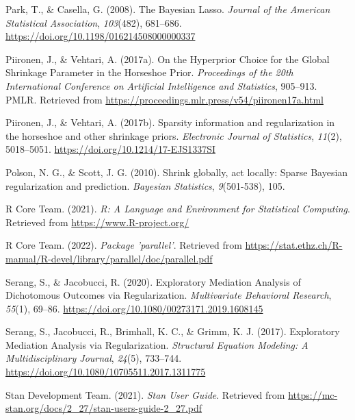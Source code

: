 \documentclass[
  man, donotrepeattitle,floatsintext]{apa6}
\newlength{\cslhangindent}
\newenvironment{CSLReferences}[2] %
 {\begin{list}{}{%
  \setlength{\itemindent}{0pt}
  \setlength{\leftmargin}{0pt}
  \setlength{\parsep}{0pt}
  \ifodd #1
   \setlength{\leftmargin}{\cslhangindent}
   \setlength{\itemindent}{-1\cslhangindent}
  \fi
  \setlength{\itemsep}{#2\baselineskip}}}
 {\end{list}}
\begin{document}
\begin{CSLReferences}{1}{0}
Park, T., \& Casella, G. (2008). The {Bayesian} {Lasso}. \emph{Journal of the American Statistical Association}, \emph{103}(482), 681--686. \url{https://doi.org/10.1198/016214508000000337}

Piironen, J., \& Vehtari, A. (2017a). On the {Hyperprior} {Choice} for the {Global} {Shrinkage} {Parameter} in the {Horseshoe} {Prior}. \emph{Proceedings of the 20th {International} {Conference} on {Artificial} {Intelligence} and {Statistics}}, 905--913. PMLR. Retrieved from \url{https://proceedings.mlr.press/v54/piironen17a.html}

Piironen, J., \& Vehtari, A. (2017b). Sparsity information and regularization in the horseshoe and other shrinkage priors. \emph{Electronic Journal of Statistics}, \emph{11}(2), 5018--5051. \url{https://doi.org/10.1214/17-EJS1337SI}

Polson, N. G., \& Scott, J. G. (2010). Shrink globally, act locally: {Sparse} {Bayesian} regularization and prediction. \emph{Bayesian Statistics}, \emph{9}(501-538), 105.

R Core Team. (2021). \emph{R: {A} {Language} and {Environment} for {Statistical} {Computing}}. Retrieved from \url{https://www.R-project.org/}

R Core Team. (2022). \emph{Package 'parallel'}. Retrieved from \url{https://stat.ethz.ch/R-manual/R-devel/library/parallel/doc/parallel.pdf}

Serang, S., \& Jacobucci, R. (2020). Exploratory {Mediation} {Analysis} of {Dichotomous} {Outcomes} via {Regularization}. \emph{Multivariate Behavioral Research}, \emph{55}(1), 69--86. \url{https://doi.org/10.1080/00273171.2019.1608145}

Serang, S., Jacobucci, R., Brimhall, K. C., \& Grimm, K. J. (2017). Exploratory {Mediation} {Analysis} via {Regularization}. \emph{Structural Equation Modeling: A Multidisciplinary Journal}, \emph{24}(5), 733--744. \url{https://doi.org/10.1080/10705511.2017.1311775}

Stan Development Team. (2021). \emph{Stan {User} {Guide}}. Retrieved from \url{https://mc-stan.org/docs/2_27/stan-users-guide-2_27.pdf}


\end{CSLReferences}
\end{document}
